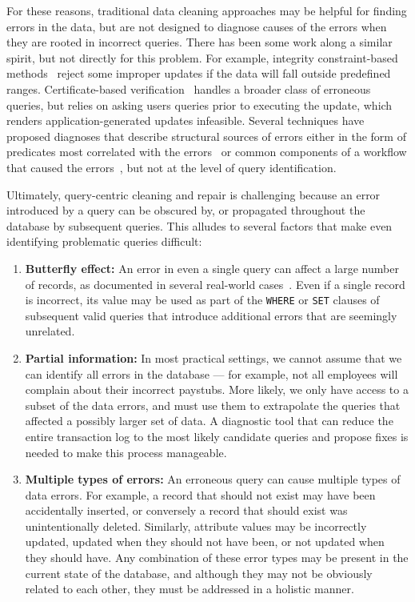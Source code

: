 For these reasons, traditional data cleaning approaches may be helpful for finding errors in the data, but are
not designed to diagnose causes of the errors when they are rooted in incorrect queries.
There has been some work along a similar spirit, but not directly for this problem.  
For example, integrity constraint-based methods~\cite{Khoussainova2006} reject some improper
updates if the data will fall outside predefined ranges.
Certificate-based verification~\cite{Chen2011} handles a broader class of erroneous queries,
but relies on asking users queries prior to executing the update, which renders application-generated
updates infeasible.
Several techniques have proposed diagnoses that describe structural sources of errors
either in the form of predicates most correlated with the errors~\cite{Wu13}
or common components of a workflow that caused the errors~\cite{wang2015}, but not at the level
of query identification.

Ultimately, query-centric cleaning and repair is challenging because an error introduced by a query can be obscured by, or propagated throughout the database
by subsequent queries. This alludes to several factors that make even identifying problematic queries difficult:

\begin{enumerate}[leftmargin=*, topsep=0mm, itemsep=0mm]

  \item \textbf{Butterfly effect: } 
  An error in even a single query can affect a large number of records, as documented in several real-world
  cases~\cite{Yates10, Grady13, sakalerrors}.  Even if a single record is incorrect,
  its value may be used as part of the \texttt{WHERE} or \texttt{SET} clauses of 
  subsequent valid queries that introduce additional errors that are seemingly unrelated.

  \item \textbf{Partial information:}  In most practical settings, we cannot assume that we can identify all
  errors in the database --- for example, not all employees will complain about their incorrect paystubs.  
  More likely, we only have access to a subset of the data errors, and must use them to extrapolate 
  the queries that affected a possibly larger set of data.  A diagnostic tool that can reduce
  the entire transaction log to the most likely candidate queries and propose fixes
  is needed to make this process manageable.


  \item \textbf{Multiple types of errors:} 
  An erroneous query can cause multiple types of data errors.  For example, a record that should not exist may have been accidentally inserted, or conversely a record that 
  should exist was unintentionally deleted.  Similarly, attribute values may be incorrectly updated,
  updated when they should not have been, or not updated when they should have.  
  Any combination of these error types may be present in the current state of the database,
  and although they may not be obviously related to each other, they must be addressed in a holistic manner.  

\end{enumerate}


